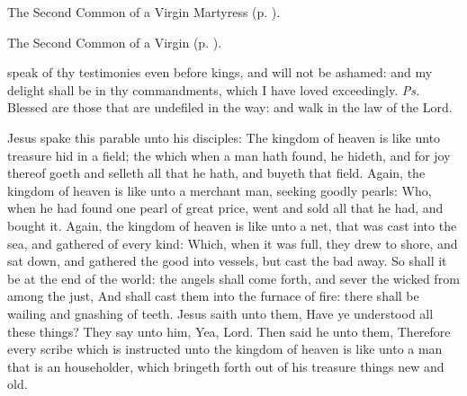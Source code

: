 \begin{rubric}
	The Second Common of a Virgin Martyress (p. \pageref{CommonVirginMartyrII}).
\end{rubric}



\begin{rubric}
	The Second Common of a Virgin (p. \pageref{CommonVirginOnlyII}).
\end{rubric}

\introit
{} speak of thy testimonies even before kings, and will not be ashamed: and my delight shall be in thy commandments, which I have loved exceedingly. \textit{Ps.} Blessed are those that are undefiled in the way: and walk in the law of the Lord.


 Jesus spake this parable unto his disciples: The kingdom of heaven is like unto treasure hid in a field; the which when a man hath found, he hideth, and for joy thereof goeth and selleth all that he hath, and buyeth that field. Again, the kingdom of heaven is like unto a merchant man, seeking goodly pearls: Who, when he had found one pearl of great price, went and sold all that he had, and bought it. Again, the kingdom of heaven is like unto a net, that was cast into the sea, and gathered of every kind: Which, when it was full, they drew to shore, and sat down, and gathered the good into vessels, but cast the bad away. So shall it be at the end of the world: the angels shall come forth, and sever the wicked from among the just, And shall cast them into the furnace of fire: there shall be wailing and gnashing of teeth. Jesus saith unto them, Have ye understood all these things? They say unto him, Yea, Lord. Then said he unto them, Therefore every scribe which is instructed unto the kingdom of heaven is like unto a man that is an householder, which bringeth forth out of his treasure things new and old.




